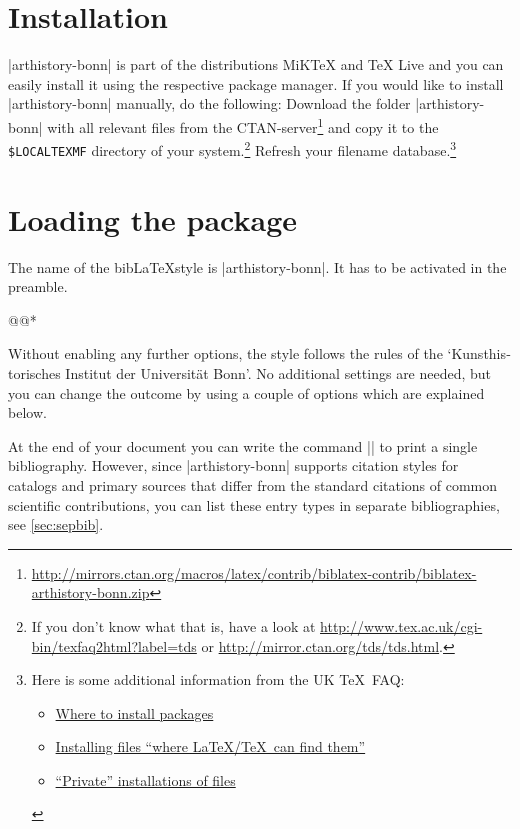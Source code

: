 \documentclass[a4paper,
10pt,
ngerman,
english
]{ltxdoc}
\begin{document}
\section{Installation}
|arthistory-bonn| is part of the distributions MiK\TeX{} and \TeX{} Live and you can easily install it using the respective package manager. 
If you would like to install |arthistory-bonn| manually, do the following:
Download the folder |arthistory-bonn| with all relevant files from the CTAN-server\footnote{\url{http://mirrors.ctan.org/macros/latex/contrib/biblatex-contrib/biblatex-arthistory-bonn.zip}} and copy it to the \texttt{\$LOCALTEXMF} directory of
 your system.\footnote{If you don't know what that is, have a look at
\url{http://www.tex.ac.uk/cgi-bin/texfaq2html?label=tds} or 
\url{http://mirror.ctan.org/tds/tds.html}.} 
Refresh your filename database.\footnote{ 
Here is some additional information from the UK \TeX\ FAQ:
\begin{itemize}[nosep,after=\vspace{-\baselineskip} ]
  \item \href{%
    http://www.tex.ac.uk/cgi-bin/texfaq2html?label=install-where}{%
    Where to install packages}
  \item \href{%
    http://www.tex.ac.uk/cgi-bin/texfaq2html?label=inst-wlcf}{%
    Installing files \enquote{where \LaTeX /\TeX\ can find them}}
  \item \href{%
    http://www.tex.ac.uk/cgi-bin/texfaq2html?label=privinst}{%
    \enquote{Private} installations of files}
\end{itemize}
}


\section{Loading the package}
  The name of the bib\LaTeX style is |arthistory-bonn|. It has to be activated in the preamble.

\begin{code}
\usepackage[style=arthistory-bonn,%
          *@@*]{biblatex}
@@*
\end{code}

Without enabling any further options, the style follows the rules of the \foreignquote*{ngerman}{Kunsthistorisches Institut der Universität Bonn}. No additional settings are needed, but you can change the outcome by using a couple of options which are explained below.

At the end of your document you can write the command |\printbibliography| to print 
a single bibliography.
However, since |arthistory-bonn| supports citation styles for catalogs and primary sources that differ from the standard citations of common scientific contributions, you can list these entry types in separate bibliographies, see \cref{sec:sepbib}.
\end{document}
